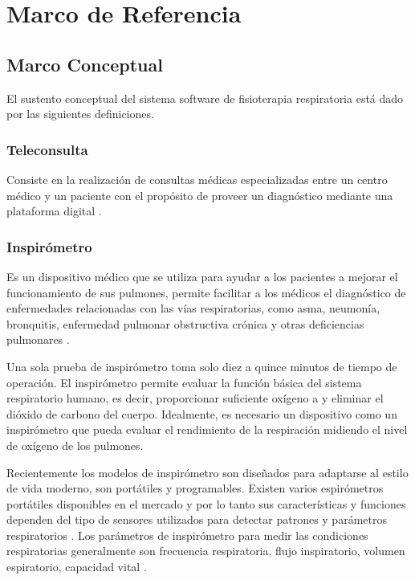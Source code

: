 \documentclass[12pt]{article}
\begin{document}
\section{Marco de Referencia}


\subsection{Marco Conceptual} 
El sustento conceptual del sistema software de fisioterapia respiratoria está dado por las siguientes definiciones.


\subsubsection{Teleconsulta}
Consiste en la realización de consultas médicas especializadas entre un centro médico y un paciente con el propósito de proveer un diagnóstico mediante una plataforma digital \cite{25}.

\subsubsection{Inspirómetro}

Es un dispositivo médico que se utiliza para ayudar a los pacientes a mejorar el funcionamiento de sus pulmones, permite facilitar a los médicos el diagnóstico de enfermedades relacionadas con las vías respiratorias, como asma, neumonía, bronquitis, enfermedad pulmonar obstructiva crónica y otras deficiencias pulmonares \cite{22}. 

Una sola prueba de inspirómetro toma solo diez a quince minutos de tiempo de operación. El inspirómetro permite evaluar la función básica del sistema respiratorio humano, es decir, proporcionar suficiente oxígeno a y eliminar el dióxido de carbono del cuerpo. Idealmente, es necesario un dispositivo como un inspirómetro que pueda evaluar el rendimiento de la respiración midiendo el nivel de oxígeno de los pulmones\cite{22}.

Recientemente los modelos de inspirómetro son diseñados para adaptarse al estilo de vida moderno, son portátiles y programables. Existen varios espirómetros portátiles disponibles en el mercado y por lo tanto sus características y funciones dependen del tipo de sensores utilizados para detectar patrones y parámetros respiratorios \cite{23}\cite{24}. Los parámetros de inspirómetro para medir las condiciones respiratorias generalmente son frecuencia respiratoria, flujo inspiratorio, volumen espiratorio, capacidad vital \cite{22}.
\end{document}
